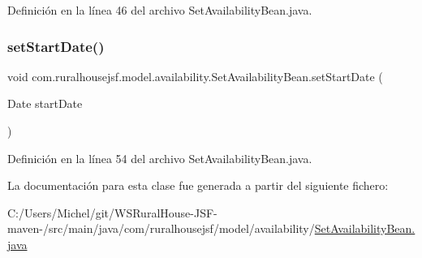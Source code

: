 Definición en la línea 46 del archivo Set\+Availability\+Bean.\+java.

\mbox{\label{classcom_1_1ruralhousejsf_1_1model_1_1availability_1_1_set_availability_bean_a13be2b2f3e792278e1b1b45cdc3c2286}} 
\subsubsection{\texorpdfstring{setStartDate()}{setStartDate()}}
{\footnotesize\ttfamily void com.\+ruralhousejsf.\+model.\+availability.\+Set\+Availability\+Bean.\+set\+Start\+Date (\begin{DoxyParamCaption}\item[{Date}]{start\+Date }\end{DoxyParamCaption})}



Definición en la línea 54 del archivo Set\+Availability\+Bean.\+java.



La documentación para esta clase fue generada a partir del siguiente fichero\+:\begin{DoxyCompactItemize}
\item 
C\+:/\+Users/\+Michel/git/\+W\+S\+Rural\+House-\/\+J\+S\+F-\/maven-\//src/main/java/com/ruralhousejsf/model/availability/\mbox{\hyperlink{_set_availability_bean_8java}{Set\+Availability\+Bean.\+java}}\end{DoxyCompactItemize}
